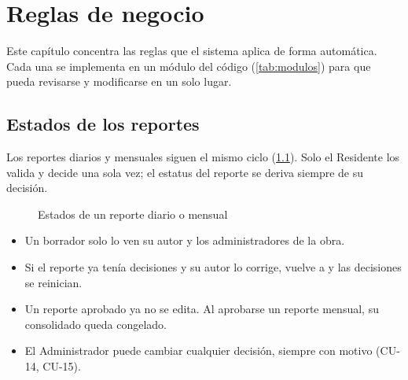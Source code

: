 \chapter{Reglas de negocio}\label{cap:reglas}
Este capítulo concentra las reglas que el sistema aplica de forma automática. Cada una se implementa en un módulo del código (\cref{tab:modulos}) para que pueda revisarse y modificarse en un solo lugar.

\section{Estados de los reportes}
Los reportes diarios y mensuales siguen el mismo ciclo (\cref{fig:estados-reporte}). Solo el Residente los valida y decide una sola vez; el estatus del reporte se deriva siempre de su decisión.

\begin{figure}[h]
\centering
{}
\caption{Estados de un reporte diario o mensual}\label{fig:estados-reporte}
\end{figure}

\begin{itemize}
  \item Un borrador solo lo ven su autor y los administradores de la obra.
  \item Si el reporte ya tenía decisiones y su autor lo corrige, vuelve a  y las decisiones se reinician.
  \item Un reporte aprobado ya no se edita. Al aprobarse un reporte mensual, su consolidado queda congelado.
  \item El Administrador puede cambiar cualquier decisión, siempre con motivo (CU-14, CU-15).
\end{itemize}

